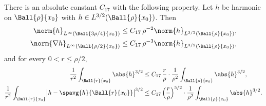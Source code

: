 \documentclass[11pt,reqno]{amsart}
\begin{document}
\begin{lemma}\label{lem:harmonic-interior}
There is an absolute constant $C_{17}$ with the following property. Let
$h$ be harmonic on $\Ball{\rho}{x_{0}}$ with $h\in L^{3/2}(\Ball{\rho}{x_{0}})$.
Then
\begin{align}
  \norm{h}_{L^{\infty}(\Ball{3\rho/4}{x_{0}})}
    &\le C_{17}\,\rho^{-2}\norm{h}_{L^{3/2}(\Ball{\rho}{x_{0}})},
    \label{eq:harm-sup}\\
  \norm{\nabla h}_{L^{\infty}(\Ball{\rho/2}{x_{0}})}
    &\le C_{17}\,\rho^{-3}\norm{h}_{L^{3/2}(\Ball{\rho}{x_{0}})},
    \label{eq:harm-grad}
\end{align}
and for every $0<r\le\rho/2$,
\begin{align}
  \frac1{r^{2}}\int_{\Ball{r}{x_{0}}}\abs{h}^{3/2}
    &\le C_{17}\,\frac r\rho\cdot\frac1{\rho^{2}}
       \int_{\Ball{\rho}{x_{0}}}\abs{h}^{3/2},
    \label{eq:harm-decay-plain}\\
  \frac1{r^{2}}\int_{\Ball{r}{x_{0}}}
     \bigl|h-\spavg{h}{\Ball{r}{x_{0}}}\bigr|^{3/2}
    &\le C_{17}\,\Bigl(\frac r\rho\Bigr)^{5/2}\cdot\frac1{\rho^{2}}
       \int_{\Ball{\rho}{x_{0}}}\abs{h}^{3/2}.
    \label{eq:harm-decay-osc}
\end{align}
\end{lemma}
\end{document}

